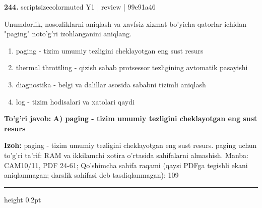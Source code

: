 \documentclass[10pt,a4paper]{article}
\begin{document}
{\bfseries\sffamily\color{ink} 244.} {scriptsizecolor{muted} Y1 | review | 99e91a46}
\par
Unumdorlik, nosozliklarni aniqlash va xavfsiz xizmat bo'yicha qatorlar ichidan "paging" noto'g'ri izohlanganini aniqlang.
\begin{enumerate}[label=\Alph*),leftmargin=9mm]
\item paging - tizim umumiy tezligini cheklayotgan eng sust resurs
\item thermal throttling - qizish sabab protsessor tezligining avtomatik pasayishi
\item diagnostika - belgi va dalillar asosida sababni tizimli aniqlash
\item log - tizim hodisalari va xatolari qaydi
\end{enumerate}
\begin{tcolorbox}[enhanced,breakable,colback=teal!4,colframe=teal!60!black,boxrule=0.45pt,arc=1.2mm,left=2.7mm,right=2.7mm,top=1.8mm,bottom=1.8mm,before skip=2mm,after skip=2mm]
{\bfseries\sffamily\color{teal}To'g'ri javob:} \textbf{A) paging - tizim umumiy tezligini cheklayotgan eng sust resurs}
\par\smallskip
{\bfseries Izoh:} paging - tizim umumiy tezligini cheklayotgan eng sust resurs. paging uchun to'g'ri ta'rif: RAM va ikkilamchi xotira o'rtasida sahifalarni almashish. Manba: CAM10/11, PDF 24-61; Qo'shimcha sahifa raqami (qaysi PDFga tegishli ekani aniqlanmagan; darslik sahifasi deb tasdiqlanmagan): 109
\end{tcolorbox}
\vspace{2mm}\hrule height 0.2pt\vspace{3mm}
\end{document}
